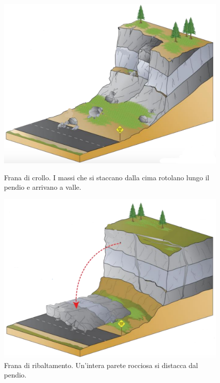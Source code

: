 \begin{figure}[h]
	\hspace{0.1\linewidth}
	\begin{minipage}[t]{0.35\linewidth}
		\centering
		\includegraphics[width=\textwidth]{images/crollo}
		\caption{Frana di crollo. I massi che si staccano dalla cima rotolano lungo il pendio e arrivano a valle. }
		\label{crollo}
	\end{minipage}
	\hspace{0.1\linewidth}
	\begin{minipage}[t]{0.35\linewidth}
		\centering
		\includegraphics[width=\textwidth]{images/Ribaltamento}
		\caption{Frana di ribaltamento. Un'intera parete rocciosa si distacca dal pendio.}
		\label{ribaltamento}
	\end{minipage}
\end{figure}

